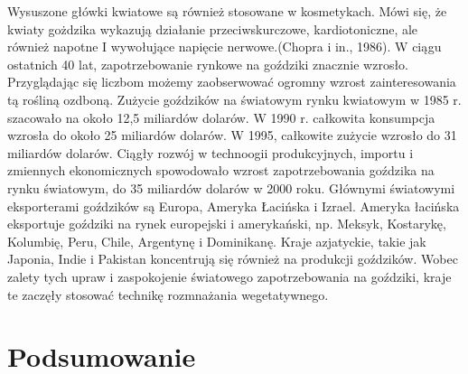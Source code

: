 \documentclass[two column, twoside, a4paper]{article}
\begin{document}
Wysuszone główki kwiatowe są również stosowane w kosmetykach. Mówi się, że kwiaty gożdzika wykazują działanie przeciwskurczowe, kardiotoniczne, ale również napotne I wywołujące napięcie nerwowe.(Chopra i in., 1986).
W ciągu ostatnich 40 lat, zapotrzebowanie rynkowe na goździki znacznie wzrosło. Przyglądając się liczbom możemy zaobserwować ogromny wzrost zainteresowania tą rośliną ozdboną. Zużycie goździków na światowym rynku kwiatowym w 1985 r. szacowało na  około 12,5 miliardów dolarów. W 1990 r. całkowita konsumpcja wzrosła do około 25 miliardów dolarów. W 1995, całkowite zużycie wzrosło do 31 miliardów dolarów. Ciągły rozwój w technoogii produkcyjnych, importu i zmiennych ekonomicznych spowodowało wzrost zapotrzebowania goździka na rynku światowym, do 35 miliardów dolarów w 2000 roku.
Głównymi światowymi eksporterami goździków są Europa, Ameryka Łacińska i Izrael.
Ameryka łacińska eksportuje goździki na rynek europejski i amerykański, np. Meksyk, Kostarykę, Kolumbię, Peru, Chile, Argentynę i Dominikanę. Kraje azjatyckie, takie jak Japonia, Indie i Pakistan koncentrują się również na produkcji goździków. Wobec
zalety tych upraw i zaspokojenie światowego zapotrzebowania na goździki, kraje te zaczęły stosować technikę rozmnażania wegetatywnego.

\section{Podsumowanie}

\printbibliography
\end{document}
